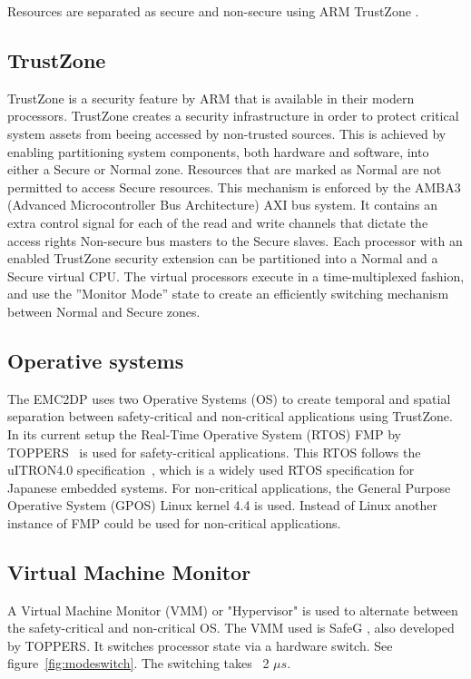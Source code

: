 Resources are separated as secure and non-secure using ARM TrustZone \cite{website:ARM}.\\

\subsection{TrustZone}
\label{sec:trustzone}
TrustZone is a security feature by ARM that is available in their modern processors. TrustZone creates a security infrastructure in order to protect critical system assets from beeing accessed by non-trusted sources. This is achieved by enabling partitioning system components, both hardware and software, into either a Secure or Normal zone. Resources that are marked as Normal are not permitted to access Secure resources. This mechanism is enforced by the AMBA3 (Advanced Microcontroller Bus Architecture) AXI bus system. It contains an extra control signal for each of the read and write channels that dictate the access rights Non-secure bus masters to the Secure slaves. Each processor with an enabled TrustZone security extension can be partitioned into a Normal and a Secure virtual CPU. The virtual processors execute in a time-multiplexed fashion, and use the ”Monitor Mode” state to create an efficiently switching mechanism between Normal and Secure zones.~\cite{zaki2016} \\ %

\subsection{Operative systems}
The EMC2DP uses two Operative Systems (OS) to create temporal and spatial separation between safety-critical and non-critical applications using TrustZone. In its current setup the Real-Time Operative System (RTOS) FMP by TOPPERS~\cite{website:FMP} is used for safety-critical applications. This RTOS follows the uITRON4.0 specification~\cite{uitron}, which is a widely used RTOS specification for Japanese embedded systems. For non-critical applications, the General Purpose Operative System (GPOS) Linux kernel 4.4 is used. Instead of Linux another instance of FMP could be used for non-critical applications.\\

\subsection{Virtual Machine Monitor}
A Virtual Machine Monitor (VMM) or "Hypervisor" is used to alternate between the safety-critical and non-critical OS. The VMM used is SafeG \cite{website:safeg}, also developed by TOPPERS. It switches processor state via a hardware switch. See figure~\ref{fig:modeswitch}. The switching takes ~2 $\mu s$.

